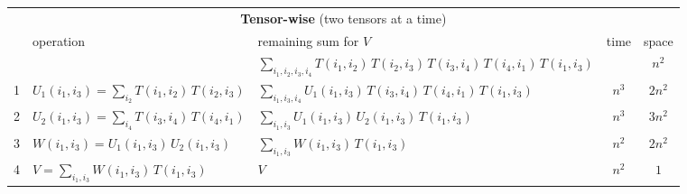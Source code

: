 \documentclass[sn-mathphys, natbib=false]{sn-jnl}
\theoremstyle{plain}
\theoremstyle{definition}
\begin{document}
\begin{bibunit}[agsm]
\begin{table}[htbp]
{\begin{tabular}{c l l c c}
\toprule
\multicolumn{5}{c}{\textbf{Tensor-wise} (two tensors at a time)} \\
\cmidrule(lr){1-5}
 & operation & remaining sum for $V$ & time & space \\
\midrule
 &  & $\sum_{i_1,i_2,i_3,i_4} T(i_1,i_2)\, T(i_2,i_3)\, T(i_3,i_4)\, T(i_4,i_1)\, T(i_1,i_3)$ &  & $n^2$ \\
\midrule
1 & $U_1(i_1,i_3) = \sum_{i_2} T(i_1,i_2)\, T(i_2,i_3)$ & $\sum_{i_1,i_3,i_4} U_1(i_1,i_3)\, T(i_3,i_4)\, T(i_4,i_1)\, T(i_1,i_3)$ & $n^3$ & $2n^2$ \\
2 & $U_2(i_1,i_3) = \sum_{i_4} T(i_3,i_4)\, T(i_4,i_1)$ & $\sum_{i_1,i_3} U_1(i_1,i_3)\, U_2(i_1,i_3)\, T(i_1,i_3)$ & $n^3$ & $3n^2$ \\
3 & $W(i_1,i_3) = U_1(i_1,i_3)\, U_2(i_1,i_3)$ & $\sum_{i_1,i_3} W(i_1,i_3)\, T(i_1,i_3)$ & $n^2$ & $2n^2$ \\
4 & $V = \sum_{i_1,i_3} W(i_1,i_3)\, T(i_1,i_3)$ & $V$ & $n^2$ & $1$ \\
\bottomrule
\end{tabular}
}
\end{table}


\end{bibunit}
\end{document}
